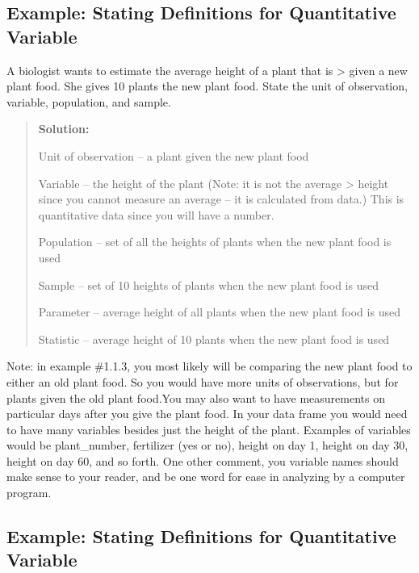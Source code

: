 \documentclass[]{book}
\begin{document}
\hypertarget{example-stating-definitions-for-quantitative-variable}{%
\subsection{Example: Stating Definitions for Quantitative Variable}\label{example-stating-definitions-for-quantitative-variable}}

A biologist wants to estimate the average height of a plant that is \textgreater{} given a new plant food. She gives 10 plants the new plant food. State the unit of observation, variable, population, and sample.

\begin{quote}
\textbf{Solution:}

Unit of observation -- a plant given the new plant food

Variable -- the height of the plant (Note: it is not the average \textgreater{} height since you cannot measure an average -- it is calculated from data.) This is quantitative data since you will have a number.

Population -- set of all the heights of plants when the new plant food is used

Sample -- set of 10 heights of plants when the new plant food is used

Parameter -- average height of all plants when the new plant food is used

Statistic -- average height of 10 plants when the new plant food is used
\end{quote}

Note: in example \#1.1.3, you most likely will be comparing the new plant food to either an old plant food. So you would have more units of observations, but for plants given the old plant food.You may also want to have measurements on particular days after you give the plant food. In your data frame you would need to have many variables besides just the height of the plant. Examples of variables would be plant\_number, fertilizer (yes or no), height on day 1, height on day 30, height on day 60, and so forth. One other comment, you variable names should make sense to your reader, and be one word for ease in analyzing by a computer program.

\hypertarget{example-stating-definitions-for-quantitative-variable-1}{%
\subsection{Example: Stating Definitions for Quantitative Variable}\label{example-stating-definitions-for-quantitative-variable-1}}
\end{document}
